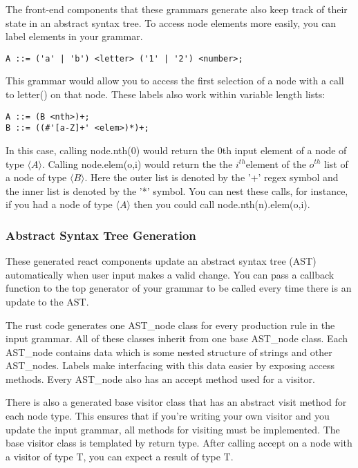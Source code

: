 \documentclass[hidelinks,12pt]{article}
\begin{document}
\begin{doublespacing}
The front-end components that these grammars generate also keep track of their state in an abstract syntax tree. To access node elements more easily, you can label elements in your grammar.

\begin{verbatim}
A ::= ('a' | 'b') <letter> ('1' | '2') <number>;
\end{verbatim}

This grammar would allow you to access the first selection of a node with a call to letter() on that node. These labels also work within variable length lists:

\begin{verbatim}
A ::= (B <nth>)+;
B ::= ((#'[a-Z]+' <elem>)*)+;
\end{verbatim}

In this case, calling node.nth(0) would return the 0th input element of a node of type $\langle A \rangle$. Calling node.elem(o,i) would return the the $i^{th}$element of the $o^{th}$ list of a node of type $\langle B \rangle$. Here the outer list is denoted by the '+' regex symbol and the inner list is denoted by the '*' symbol. You can nest these calls, for instance, if you had a node of type $\langle A \rangle$ then you could call node.nth(n).elem(o,i).

\subsubsection*{Abstract Syntax Tree Generation}
These generated react components update an abstract syntax tree (AST) automatically when user input makes a valid change. You can pass a callback function to the top generator of your grammar to be called every time there is an update to the AST.

The rust code generates one AST\_node class for every production rule in the input grammar. All of these classes inherit from one base AST\_node class. Each AST\_node contains data which is some nested structure of strings and other AST\_nodes. Labels make interfacing with this data easier by exposing access methods. Every AST\_node also has an accept method used for a visitor.

There is also a generated base visitor class that has an abstract visit method for each node type. This ensures that if you're writing your own visitor and you update the input grammar, all methods for visiting must be implemented. The base visitor class is templated by return type. After calling accept on a node with a visitor of type T, you can expect a result of type T.


\end{doublespacing}
\end{document}
